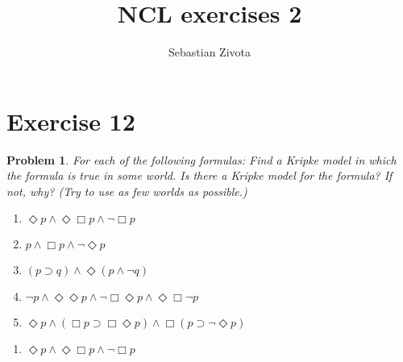 \documentclass[a4paper,10pt]{article}
\title{NCL exercises 2}
\author{Sebastian Zivota}
\newcommand{\imp}{\supset}
\newcommand{\Dia}{\Diamond}
\newtheorem*{problem*}{Problem}
\theoremstyle{definition}
\begin{document}
\maketitle

\section*{Exercise 12}

\begin{problem*}
For each of the following formulas:
Find a Kripke model in which the formula is true in some world. Is
there a Kripke model for the formula?  If not, why?
(Try to use as few worlds as possible.)

\begin{enumerate}
 \item $\Dia p ∧ \Dia \Box p ∧ ¬ \Box p$
 \item $p ∧ \Box p ∧ ¬ \Dia p$
 \item $(p \imp q) ∧ \Dia (p ∧ ¬q)$
 \item $¬ p ∧ \Dia \Dia p ∧ ¬ \Box\Dia p ∧ \Dia\Box ¬p$
 \item $\Dia p ∧ (\Box p \imp \Box\Dia p) ∧ \Box (p \imp ¬\Dia p)$
\end{enumerate}
\end{problem*}
\begin{enumerate}
 \item $\Dia p ∧ \Dia \Box p ∧ ¬ \Box p$

\end{enumerate}
\end{document}
